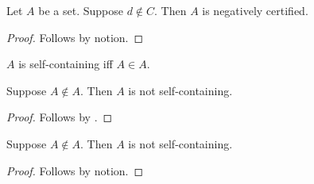 \begin{proposition}\label{horn_negative_body_consumer}
    Let $A$ be a set.
    Suppose $d\notin C$.
    Then $A$ is negatively certified.
\end{proposition}
\begin{proof}
    Follows by notion.
\end{proof}

\begin{definition}\label{horn_self_containing}
    $A$ is self-containing iff $A\in A$.
\end{definition}

\begin{classification}\label{horn_not_self_containing}
    Suppose $A\notin A$.
    Then $A$ is not self-containing.
\end{classification}
\begin{proof}
    Follows by .
\end{proof}

\begin{proposition}\label{horn_negative_named_consumer}
    Suppose $A\notin A$.
    Then $A$ is not self-containing.
\end{proposition}
\begin{proof}
    Follows by notion.
\end{proof}
